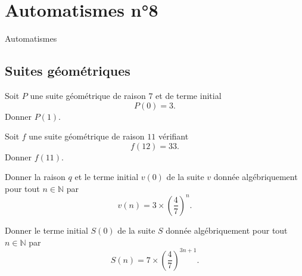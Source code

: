 \documentclass[14pt]{beamer}
\newcommand{\N}{\mathbb{N}}
\begin{document}
\section{Automatismes n°8}

\begin{frame}

\centering \huge
Automatismes

\end{frame}

\subsection{Suites géométriques}

\begin{frame}{1}
    Soit $P$ une suite géométrique de raison $7$ et de terme initial
        \[ P(0) = 3. \]
    Donner $P(1)$.
\end{frame}

\begin{frame}{2}
    Soit $f$ une suite géométrique de raison $11$ vérifiant
        \[ f(12) = 33. \]
    Donner $f(11)$.
\end{frame}

\begin{frame}{3}
	Donner la raison $q$ et le terme initial $v(0)$ de la suite $v$ donnée algébriquement pour tout $n\in\N$ par 
		\[ v(n) = 3 \times \left( \dfrac47 \right)^n. \]
\end{frame}

\begin{frame}{4}
	Donner le terme initial $S(0)$ de la suite $S$ donnée algébriquement pour tout $n\in\N$ par 
		\[ S(n) = 7 \times \left( \dfrac47 \right)^{3n+1}. \]
\end{frame}
\end{document}
